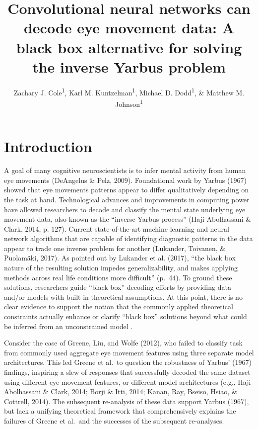 \documentclass[
  english,
  man]{apa6}
\author{Zachary J. Cole\textsuperscript{1}, Karl M. Kuntzelman\textsuperscript{1}, Michael D. Dodd\textsuperscript{1}, \& Matthew M. Johnson\textsuperscript{1}}
\affiliation{
\vspace{0.5cm}
\textsuperscript{1} University of Nebraska-Lincoln}
\title{Convolutional neural networks can decode eye movement data: A black box alternative for solving the inverse Yarbus problem}
\date{}
\begin{document}
\maketitle

\section{Introduction}

A goal of many cognitive neuroscientists is to infer mental activity from human eye movements (DeAngelus \& Pelz, 2009). Foundational work by Yarbus (1967) showed that eye movements patterns appear to differ qualitatively depending on the task at hand. Technological advances and improvements in computing power have allowed researchers to decode and classify the mental state underlying eye movement data, also known as the \enquote{inverse Yarbus process} (Haji-Abolhassani \& Clark, 2014, p. 127). Current state-of-the-art machine learning and neural network algorithms that are capable of identifying diagnostic patterns in the data appear to trade one inverse problem for another (Lukander, Toivanen, \& Puolamäki, 2017). As pointed out by Lukander et al. (2017), \enquote{the black box nature of the resulting solution impedes generalizability, and makes applying methods across real life conditions more difficult} (p.~44). To ground these solutions, researchers guide \enquote{black box} decoding efforts by providing data and/or models with built-in theoretical assumptions. At this point, there is no clear evidence to support the notion that the commonly applied theoretical constraints actually enhance or clarify \enquote{black box} solutions beyond what could be inferred from an unconstrained model .

Consider the case of Greene, Liu, and Wolfe (2012), who failed to classify task from commonly used aggregate eye movement features using three separate model architectures. This led Greene et al.~to question the robustness of Yarbus' (1967) findings, inspiring a slew of responses that successfully decoded the same dataset using different eye movement features, or different model architectures (e.g., Haji-Abolhassani \& Clark, 2014; Borji \& Itti, 2014; Kanan, Ray, Bseiso, Hsiao, \& Cottrell, 2014). The subsequent re-analysis of these data support Yarbus (1967), but lack a unifying theoretical framework that comprehensively explains the failures of Greene et al.~and the successes of the subsequent re-analyses.
\end{document}
